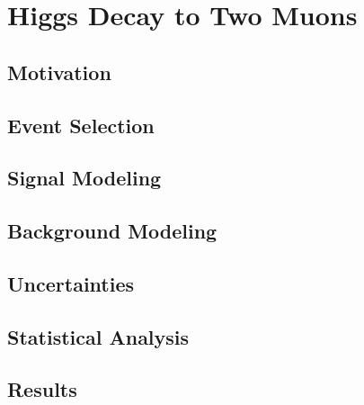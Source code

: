 \chapter{Higgs Decay to Two Muons}\label{sec:hmumu}

\section{Motivation}
\section{Event Selection}
\section{Signal Modeling}
\section{Background Modeling}
\section{Uncertainties}
\section{Statistical Analysis}
\section{Results}

